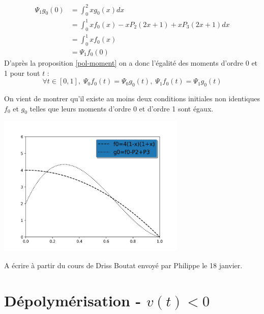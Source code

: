 \documentclass[a4paper]{article}
\begin{document}
\begin{preuve}
	\[
	\begin{split}
		\Psi_1 g_0 (0) & = \int_0^2 x g_0(x)dx \\
		               & = \int_0^1 xf_0 (x) - xP_2(2x+1) + xP_3(2x+1) dx \\
					   & =  \int_0^1 xf_0 (x) \\
					   & = \Psi_1 f_0 (0)
	\end{split}
	\]
	D'après la proposition \ref{pol-moment} on a donc l'égalité des moments d'ordre 0 et 1 pour tout $t$ :
	\[ \forall t \in [0,1], \; \Psi_0 f_0 (t) = \Psi_0 g_0 (t), \; \Psi_1 f_0 (t)=\Psi_1 g_0 (t)\]
	
	On vient de montrer qu'il existe au moins deux conditions initiales non identiques $f_0$ et $g_0$ telles que leurs moments d'ordre 0 et d'ordre 1 sont égaux. 
	
	\includegraphics[width=9cm]{f0g0.png}
	

\end{preuve}
	
A écrire à partir du cours de Driss Boutat envoyé par Philippe le 18 janvier.


\section{Dépolymérisation - $v(t) < 0$}
\end{document}
